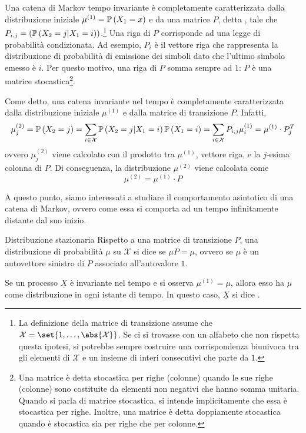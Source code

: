 Una catena di Markov tempo invariante è completamente caratterizzata dalla distribuzione iniziale \(\mu^{(1)}=\Prob[X_1 = x]\) e da una matrice \(P\), detta , tale che \(P_{i,j} = (\Prob[X_2 = j | X_1 = i])\).\footnote{La definizione della matrice di transizione assume che \(\mathcal{X} = \set{1, \ldots, \abs{\mathcal{X}}}\). Se ci si trovasse con un alfabeto che non rispetta questa ipotesi, si potrebbe sempre costruire una corrispondenza biunivoca tra gli elementi di \(\mathcal{X}\) e un insieme di interi consecutivi che parte da $1$.} 
Una riga di $P$ corrisponde ad una legge di probabilità condizionata. Ad esempio, $P_{i}$ è il vettore riga che rappresenta la distribuzione di probabilità di emissione dei simboli dato che l'ultimo simbolo emesso è $i$. 
Per questo motivo, una riga di $P$ somma sempre ad $1$: $P$ è una matrice stocastica\footnote{Una matrice è detta stocastica per righe (colonne) quando le sue righe (colonne) sono costituite da elementi non negativi che hanno somma unitaria. Quando si parla di matrice stocastica, si intende implicitamente che essa è stocastica per righe. Inoltre, una matrice è detta doppiamente stocastica quando è stocastica sia per righe che per colonne.}.

Come detto, una catena invariante nel tempo è completamente caratterizzata dalla distribuzione iniziale $\mu^{(1)}$ e dalla matrice di transizione $P$. Infatti,
\[\mu^{(2)}_j = \Prob[X_{2}=j] = \sum_{i \in \mathcal{X}}\Prob[X_2 = j | X_1 = i]\Prob[X_1 = i] = \sum_{i \in \mathcal{X}} P_{i,j}\mu^{(1)}_i = \mu^{(1)} \cdot P^{T}_{j}\]
ovvero $\mu^{(2)}_{j}$ viene calcolato con il prodotto tra $\mu^{(1)}$, vettore riga, e la $j$-esima colonna di $P$. 
Di conseguenza, la distribuzione $\mu^{(2)}$ viene calcolata come
\[\mu^{(2)}=\mu^{(1)}\cdot P\]

A questo punto, siamo interessati a studiare il comportamento asintotico di una catena di Markov, ovvero come essa si comporta ad un tempo infinitamente distante dal suo inizio.

\begin{definition}{Distribuzione stazionaria}
Rispetto a una matrice di transizione \(P\), una distribuzione di probabilità \(\mu\) su \(\mathcal{X}\) si dice  se \(\mu P = \mu\), ovvero se \(\mu\) è un autovettore sinistro di \(P\) associato all'autovalore \(1\).
\end{definition}

Se un processo \(\underline{X}\) è invariante nel tempo e si osserva $\mu^{(1)}=\mu$, allora esso ha $\mu$ come distribuzione in ogni istante di tempo. In questo caso, \(\underline{X}\) si dice .

